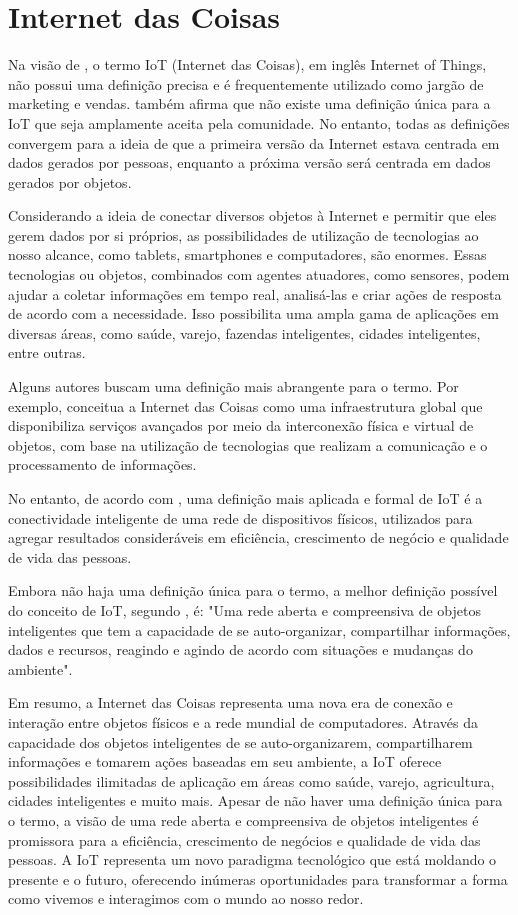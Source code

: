 \documentclass[tcc,capa]{texufpel}
\begin{document}
\section{Internet das Coisas}
Na visão de \citet{UCKELMANN:2011}, o termo IoT (Internet das Coisas), em inglês Internet of Things, não possui uma definição precisa e é frequentemente utilizado como jargão de marketing e vendas. \citet{Madakam:2015} também afirma que não existe uma definição única para a IoT que seja amplamente aceita pela comunidade. No entanto, todas as definições convergem para a ideia de que a primeira versão da Internet estava centrada em dados gerados por pessoas, enquanto a próxima versão será centrada em dados gerados por objetos.

Considerando a ideia de conectar diversos objetos à Internet e permitir que eles gerem dados por si próprios, as possibilidades de utilização de tecnologias ao nosso alcance, como tablets, smartphones e computadores, são enormes. Essas tecnologias ou objetos, combinados com agentes atuadores, como sensores, podem ajudar a coletar informações em tempo real, analisá-las e criar ações de resposta de acordo com a necessidade. Isso possibilita uma ampla gama de aplicações em diversas áreas, como saúde, varejo, fazendas inteligentes, cidades inteligentes, entre outras.

Alguns autores buscam uma definição mais abrangente para o termo. Por exemplo, \citet{Atzori:2010} conceitua a Internet das Coisas como uma infraestrutura global que disponibiliza serviços avançados por meio da interconexão física e virtual de objetos, com base na utilização de tecnologias que realizam a comunicação e o processamento de informações.

No entanto, de acordo com \citet{Noronha:2014}, uma definição mais aplicada e formal de IoT é a conectividade inteligente de uma rede de dispositivos físicos, utilizados para agregar resultados consideráveis em eficiência, crescimento de negócio e qualidade de vida das pessoas.

Embora não haja uma definição única para o termo, a melhor definição possível do conceito de IoT, segundo \citet{Madakam:2015}, é: "Uma rede aberta e compreensiva de objetos inteligentes que tem a capacidade de se auto-organizar, compartilhar informações, dados e recursos, reagindo e agindo de acordo com situações e mudanças do ambiente".

Em resumo, a Internet das Coisas representa uma nova era de conexão e interação entre objetos físicos e a rede mundial de computadores. Através da capacidade dos objetos inteligentes de se auto-organizarem, compartilharem informações e tomarem ações baseadas em seu ambiente, a IoT oferece possibilidades ilimitadas de aplicação em áreas como saúde, varejo, agricultura, cidades inteligentes e muito mais. Apesar de não haver uma definição única para o termo, a visão de uma rede aberta e compreensiva de objetos inteligentes é promissora para a eficiência, crescimento de negócios e qualidade de vida das pessoas. A IoT representa um novo paradigma tecnológico que está moldando o presente e o futuro, oferecendo inúmeras oportunidades para transformar a forma como vivemos e interagimos com o mundo ao nosso redor.
\end{document}
